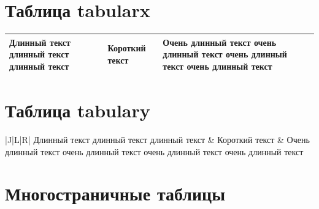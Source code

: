 \documentclass[a4paper,12pt]{article}
\begin{document}
\section{Таблица tabularx}

\noindent
\begin{tabularx}{\textwidth}{|X|X|X|}
  \hline
  Длинный текст длинный текст длинный текст &
  Короткий текст &
  Очень длинный текст очень длинный текст очень длинный текст очень длинный текст \\
  \hline
\end{tabularx}

\section{Таблица tabulary}

\noindent
\begin{tabulary}{\textwidth}{|J|L|R|}
  \hline
  Длинный текст длинный текст длинный текст &
  Короткий текст &
  Очень длинный текст очень длинный текст очень длинный текст очень длинный текст\\
  \hline
\end{tabulary}

\section{Многостраничные таблицы}
\end{document}
